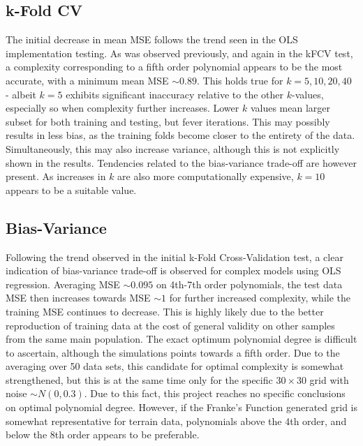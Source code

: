 \documentclass[%
oneside,                 %
final,                   %
10pt]{article}
\begin{document}
\subsection{k-Fold CV}
The initial decrease in mean MSE follows the trend seen in the OLS implementation testing.  As was observed previously, and again in the kFCV test, a complexity corresponding to a fifth order polynomial appears to be the most accurate, with a minimum mean MSE $\sim 0.89$. This holds true for $k=5,10,20,40$ - albeit $k=5$ exhibits significant inaccuracy relative to the other $k$-values, especially so when complexity further increases. Lower $k$ values mean larger subset for both training and testing, but fever iterations. This may possibly results in less bias, as the training folds become closer to the entirety of the data. Simultaneously, this may also increase variance, although this is not explicitly shown in the results. Tendencies related to the bias-variance trade-off are however present. As increases in $k$ are also more computationally expensive, $k=10$ appears to be a suitable value.

\subsection{Bias-Variance}
Following the trend observed in the initial k-Fold Cross-Validation test, a clear indication of bias-variance trade-off is observed for complex models using OLS regression. Averaging MSE $\sim 0.095$ on 4th-7th order polynomials, the test data MSE then increases towards MSE $\sim 1$ for further increased complexity, while the training MSE continues to decrease. This is highly likely due to the better reproduction of training data at the cost of general validity on other samples from the same main population. The exact optimum polynomial degree is difficult to ascertain, although the simulations points towards a fifth order. Due to the averaging over 50 data sets, this candidate for optimal complexity is somewhat strengthened, but this is at the same time only for the specific $30 \times 30$ grid with noise $\sim N(0,0.3)$. Due to this fact, this project reaches no specific conclusions on optimal polynomial degree. However, if the Franke's Function generated grid is somewhat representative for terrain data, polynomials above the 4th order, and below the 8th order appears to be preferable.
\end{document}
